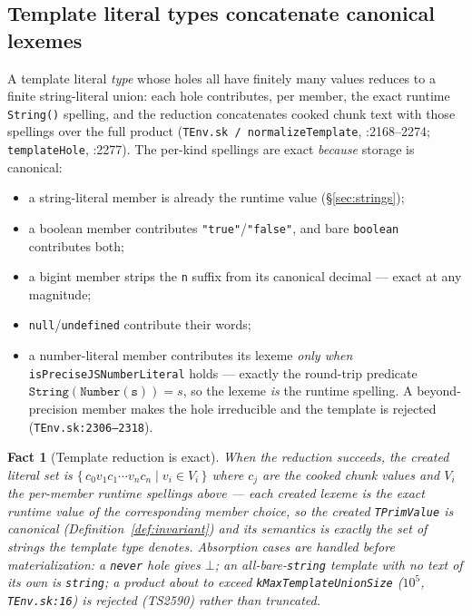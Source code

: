 \documentclass[11pt]{article}
\newtheorem{fact}[theorem]{Fact}
\begin{document}
\subsection{Template literal types concatenate canonical lexemes}
\label{sec:templates}

A template literal \emph{type} whose holes all have finitely many
values reduces to a finite string-literal union: each hole contributes,
per member, the exact runtime \texttt{String()} spelling, and the
reduction concatenates cooked chunk text with those spellings over the
full product (\texttt{TEnv.sk / normalizeTemplate}, :2168--2274;
\texttt{templateHole}, :2277). The per-kind spellings are exact
\emph{because} storage is canonical:

\begin{itemize}
\item a string-literal member is already the runtime value
  (\S\ref{sec:strings});
\item a boolean member contributes \texttt{"true"}/\texttt{"false"},
  and bare \texttt{boolean} contributes both;
\item a bigint member strips the \texttt{n} suffix from its canonical
  decimal --- exact at any magnitude;
\item \texttt{null}/\texttt{undefined} contribute their words;
\item a number-literal member contributes its lexeme \emph{only when}
  \texttt{isPreciseJSNumberLiteral} holds --- exactly the round-trip
  predicate $\mathtt{String(Number(s))} = s$, so the lexeme \emph{is}
  the runtime spelling. A beyond-precision member makes the hole
  irreducible and the template is rejected
  (\texttt{TEnv.sk:2306--2318}).
\end{itemize}

\begin{fact}[Template reduction is exact]
\label{fact:template}
When the reduction succeeds, the created literal set is
$\{\,c_0 v_1 c_1 \cdots v_n c_n \mid v_i \in V_i\,\}$ where $c_j$ are
the cooked chunk values and $V_i$ the per-member runtime spellings
above --- each created lexeme is the exact runtime value of the
corresponding member choice, so the created \texttt{TPrimValue} is
canonical (Definition~\ref{def:invariant}) and its semantics is exactly
the set of strings the template type denotes. Absorption cases are
handled before materialization: a \texttt{never} hole gives $\bot$; an
all-bare-\texttt{string} template with no text of its own \emph{is}
\texttt{string}; a product about to exceed
\texttt{kMaxTemplateUnionSize} ($10^5$, \texttt{TEnv.sk:16}) is
rejected (TS2590) rather than truncated.
\end{fact}
\end{document}
